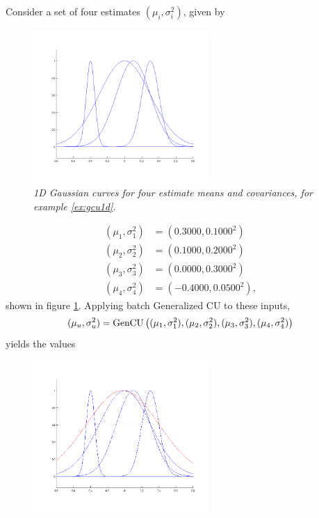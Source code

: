 \begin{example}\label{ex:gcu1d}

Consider a set of four estimates $(\mu_i,\sigma_i^2)$, given by
\begin{figure}[tbp]
    \centering\includegraphics[width=0.6\textwidth]{figures/est1d-4.png}
    \caption{\it 1D Gaussian curves for four estimate means and covariances, for example \ref{ex:gcu1d}.}
    \label{fig:est1d-4}
\end{figure}
\begin{align}
    (\mu_1,\sigma_1^2) &= (0.3000,0.1000^2)\\\nonumber
    (\mu_2,\sigma_2^2) &= (0.1000,0.2000^2)\\\nonumber
    (\mu_3,\sigma_3^2) &= (0.0000,0.3000^2)\\\nonumber
    (\mu_4,\sigma_4^2) &= (-0.4000,0.0500^2),\label{ex:est1d-4}
\end{align}
shown in figure \ref{fig:est1d-4}. Applying batch Generalized CU to these inputs,
\begin{equation}
    (\mu_u,\sigma_u^2) = \operatorname{GenCU}\left((\mu_1,\sigma_1^2),(\mu_2,\sigma_2^2),(\mu_3,\sigma_3^2),(\mu_4,\sigma_4^2)\right)
\end{equation}
yields the values
\begin{figure}[tbp]
    \centering\includegraphics[width=0.6\textwidth]{figures/cu1d.png}

\end{figure}
\end{example}
